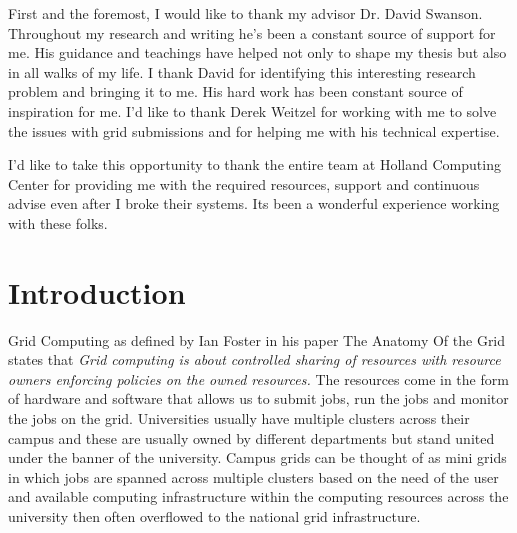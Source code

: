 \documentclass[ms,electronic,double]{nuthesis}
\begin{document}

\begin{acknowledgments}

First and the foremost, I would like to thank my advisor Dr. David Swanson. Throughout my research
and writing he's been a constant source of support for me. His guidance and teachings have helped not 
only to shape my thesis but also in all walks of my life. I thank David for identifying this interesting
research problem and bringing it to me. His hard work has been constant source of inspiration
for me. I'd like to thank Derek Weitzel for working with me to solve the 
 issues with grid submissions and for helping me with his technical expertise.
 
 I'd like to take this opportunity to thank the entire team at Holland 
Computing Center for providing me with the required resources, support and continuous advise
 even after I broke their systems. Its been a wonderful experience 
 working with these folks.
 
\end{acknowledgments}

\tableofcontents
\newpage
\listoffigures
\listoftables


\mainmatter

\chapter{Introduction}
Grid Computing as defined by Ian Foster in his paper The Anatomy Of the Grid \cite{Foster:2001:AGE:1080644.1080667}
states that 
\emph{Grid computing is about controlled sharing of resources with resource owners enforcing policies 
on the owned resources.} The resources come in the form of hardware 
and software that allows us to submit jobs, run the jobs and monitor the jobs on the grid. 
Universities usually have multiple clusters across their campus and these are 
usually owned by different departments but stand united under the banner of the university.
Campus grids can be thought of as mini grids in which jobs are spanned across multiple clusters
 based on the need of the user and available computing infrastructure within the computing resources across the university then often overflowed to the national
grid infrastructure\cite{derekThesis}.
\end{document}
